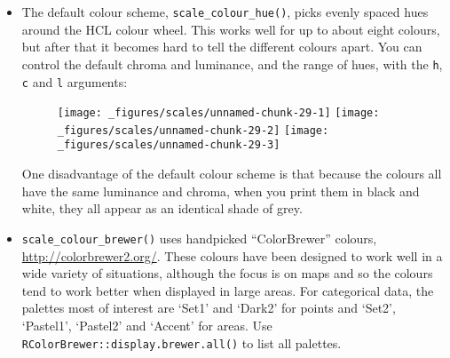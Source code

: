 \begin{itemize}
\item
  The default colour scheme, \texttt{scale\_colour\_hue()}, picks evenly
  spaced hues around the HCL colour wheel. This works well for up to
  about eight colours, but after that it becomes hard to tell the
  different colours apart. You can control the default chroma and
  luminance, and the range of hues, with the \texttt{h}, \texttt{c} and
  \texttt{l} arguments:

\begin{Shaded}
\begin{Highlighting}[]
\OperatorTok{+}\StringTok{ }\NormalTok{(} \NormalTok{)}
\OperatorTok{+}\StringTok{ }\NormalTok{(} \NormalTok{(}\NormalTok{, }\NormalTok{))}
\end{Highlighting}
\end{Shaded}

  \begin{figure}[H]
    \texttt{[image: \_figures/scales/unnamed-chunk-29-1]}%
    \texttt{[image: \_figures/scales/unnamed-chunk-29-2]}%
    \texttt{[image: \_figures/scales/unnamed-chunk-29-3]}
  \end{figure}

  One disadvantage of the default colour scheme is that because the
  colours all have the same luminance and chroma, when you print them in
  black and white, they all appear as an identical shade of grey.
\item
  \texttt{scale\_colour\_brewer()} uses handpicked ``ColorBrewer''
  colours, \url{http://colorbrewer2.org/}. These colours have been
  designed to work well in a wide variety of situations, although the
  focus is on maps and so the colours tend to work better when displayed
  in large areas. For categorical data, the palettes most of interest
  are `Set1' and `Dark2' for points and `Set2', `Pastel1', `Pastel2' and
  `Accent' for areas. Use \texttt{RColorBrewer::display.brewer.all()} to
  list all palettes. 

\begin{Shaded}
\begin{Highlighting}[]
\OperatorTok{+}\StringTok{ }\NormalTok{(} \NormalTok{)}
\OperatorTok{+}\StringTok{ }\NormalTok{(} \NormalTok{)}
\OperatorTok{+}\StringTok{ }\NormalTok{(} \NormalTok{)}
\end{Highlighting}
\end{Shaded}


\end{itemize}
